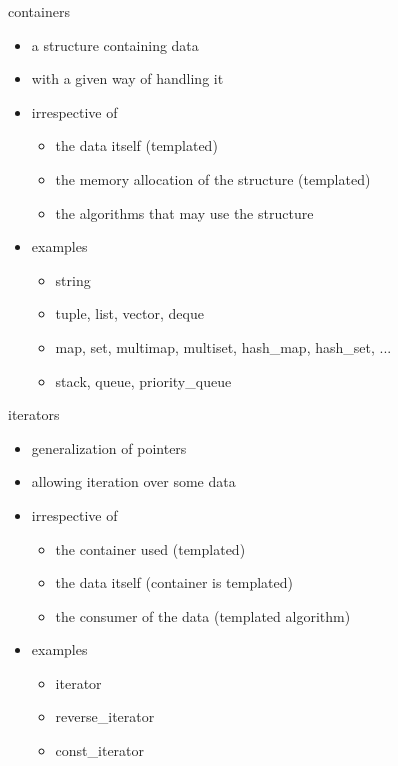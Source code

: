 \begin{frame}[fragile]
  \begin{block}{containers}
    \begin{itemize}
    \item a structure containing data
    \item with a given way of handling it
    \item irrespective of
      \begin{itemize}
      \item the data itself (templated)
      \item the memory allocation of the structure (templated)
      \item the algorithms that may use the structure
      \end{itemize}
    \item examples
      \begin{itemize}
      \item string
      \item tuple, list, vector, deque
      \item map, set, multimap, multiset, hash\_map, hash\_set, ...
      \item stack, queue, priority\_queue
      \end{itemize}
    \end{itemize}
  \end{block}
\end{frame}

\begin{frame}[fragile]
  \begin{block}{iterators}
    \begin{itemize}
    \item generalization of pointers
    \item allowing iteration over some data
    \item irrespective of
      \begin{itemize}
      \item the container used (templated)
      \item the data itself (container is templated)
      \item the consumer of the data (templated algorithm)
      \end{itemize}
    \item examples
      \begin{itemize}
      \item iterator
      \item reverse\_iterator
      \item const\_iterator
      \end{itemize}
    \end{itemize}
  \end{block}
\end{frame}

